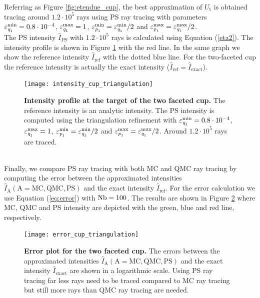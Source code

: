 Referring as Figure \ref{fig:etendue_cup}, the best approximation of $U_{\textrm{t}}$ is obtained tracing around $1.2 \cdot 10^5$ rays using PS ray tracing with parameters $\varepsilon_{\textit{q}_1}^{\textrm{min}}=0.8\cdot 10^{-4}$, $\varepsilon_{\textit{q}_1}^{\textrm{max}}=1$, $\varepsilon_{\textit{p}_1}^{\textrm{min}}=\varepsilon_{\textit{q}_1}^{\textrm{min}}/2$ and $\varepsilon_{\textit{p}_1}^{\textrm{max}}= \varepsilon_{\textit{q}_1}^{\textrm{max}}/2$. 
\\ \indent The PS intensity $\hat{I}_{PS}$ with $1.2 \cdot 10^5$ rays is calculated using Equation (\ref{eta2}). The intensity profile is shown in Figure \ref{fig:intensity_cup_triangulation} with the red line. In the same graph we show the reference intensity $\hat{I}_{\textrm{ref}}$ with the dotted blue line. For the two-faceted cup the reference intensity is actually the exact intensity ($\hat{I}_{\textrm{ref}}= \hat{I}_{\textrm{exact}}$). 
 \begin{figure}[h!]
  \center
  \texttt{[image: intensity\_cup\_triangulation]}
  \caption{\textbf{Intensity profile at the target of the two faceted cup.} The reference intensity is an analytic intensity. The PS intensity is computed using the triangulation refinement with $\varepsilon_{\textit{q}_1}^{\textrm{min}}=0.8\cdot 10^{-4}$, $\varepsilon_{\textit{q}_1}^{\textrm{max}}=1$, $\varepsilon_{\textit{p}_1}^{\textrm{min}}=\varepsilon_{\textit{q}_1}^{\textrm{min}}/2$ and $\varepsilon_{\textit{p}_1}^{\textrm{max}}= \varepsilon_{\textit{q}_1}^{\textrm{max}}/2$. Around $1.2 \cdot 10^5$ rays are traced.}
  \label{fig:intensity_cup_triangulation}
\end{figure}
\\ \indent 
Finally, we compare PS ray tracing with both MC and QMC ray tracing by computing the error between the approximated intensities $\hat{I}_{\textrm{A}}  (\textrm{A}= \textrm{MC}, \textrm{QMC}, \textrm{PS})$ and the exact intensity $\hat{I}_{\textrm{ref}}$. For the error calculation we use Equation (\ref{eq:error}) with $\textrm{Nb} = 100$. The results are shown in Figure \ref{fig:error_cup_triangulation} where MC, QMC and PS intensity are depicted with the green, blue and red line, respectively.
 \begin{figure}[h]
  \center
  \texttt{[image: error\_cup\_triangulation]}
  \caption{\textbf{Error plot for the two faceted cup.} The errors between the approximated intensities $\hat{I}_{\textrm{A}} (\textrm{A}= \textrm{MC}, \textrm{QMC}, \textrm{PS})$ and the exact intensity $\hat{I}_{\textrm{exact}}$ are shown in a logarithmic scale. Using PS ray tracing far less rays need to be traced compared to MC ray tracing but still more rays than QMC ray tracing are needed.}
  \label{fig:error_cup_triangulation}
\end{figure}
